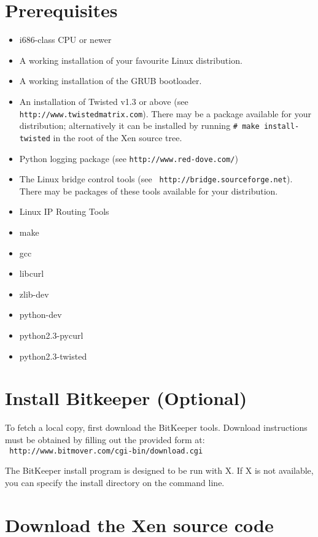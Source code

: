 \documentclass[11pt,twoside,final,openright]{xenstyle}
\begin{document}
\section{Prerequisites}
\label{sec:prerequisites}
\begin{itemize}
\item i686-class CPU or newer
\item A working installation of your favourite Linux distribution.
\item A working installation of the GRUB bootloader.
\item An installation of Twisted v1.3 or above (see {\tt
http://www.twistedmatrix.com}).  There may be a package available for
your distribution; alternatively it can be installed by running {\tt \#
make install-twisted} in the root of the Xen source tree.
\item Python logging package (see {\tt http://www.red-dove.com/})
\item The Linux bridge control tools (see {\tt
http://bridge.sourceforge.net}).  There may be packages of these tools
available for your distribution.
\item Linux IP Routing Tools
\item make
\item gcc
\item libcurl
\item zlib-dev
\item python-dev
\item python2.3-pycurl
\item python2.3-twisted
\end{itemize}

\section{Install Bitkeeper (Optional)}

To fetch a local copy, first download the BitKeeper tools.
Download instructions must be obtained by filling out the provided
form at: \\ {\tt
http://www.bitmover.com/cgi-bin/download.cgi }

The BitKeeper install program is designed to be run with X.  If X is
not available, you can specify the install directory on the command
line.

\section{Download the Xen source code}
\end{document}
